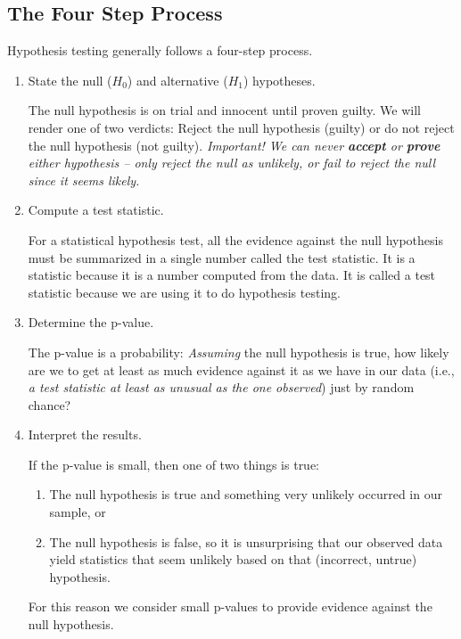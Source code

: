 \documentclass[twoside]{book}\usepackage[]{graphicx}\usepackage[]{xcolor}
\begin{document}
\subsection{The Four Step Process}
Hypothesis testing generally follows a four-step process.
\begin{enumerate}
	\item 
		State the null ($H_0$) and alternative ($H_1$) hypotheses.

		The null hypothesis is on trial and innocent until proven guilty.  We will
		render one of two verdicts:  Reject the null hypothesis (guilty) or do not reject
		the null hypothesis (not guilty).  \emph{Important!  We can never \textbf{accept} or \textbf{prove} either hypothesis -- only reject the null as unlikely, or fail to reject the null since it seems likely.}

	\item
		Compute a test statistic.

		For a statistical hypothesis test, all the evidence against the null hypothesis must be summarized in a
		single number called the test statistic.  It is a statistic because 
		it is a number computed from the data.  It is called a test statistic
		because we are using it to do hypothesis testing.

	\item
		Determine the p-value.

		The p-value is a probability:  \emph{Assuming} the null hypothesis is true,
		how likely are we to get at least as much evidence against it as we have in our data (i.e., \emph{a
		test statistic at least as unusual as the one observed}) just by random chance?

	\item
		Interpret the results.

		If the p-value is small, then one of two things is true:
		\begin{enumerate}
			\item The null hypothesis is true and something very unlikely occurred
				in our sample, or 
			\item The null hypothesis is false, so it is unsurprising that our observed data yield statistics that seem unlikely based on that (incorrect, untrue) hypothesis.
		\end{enumerate}
		For this reason we consider small p-values to provide evidence against the null
		hypothesis.
\end{enumerate}

\end{document}
